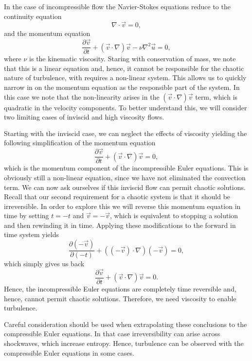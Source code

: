 In the case of incompressible flow the Navier-Stokes equations reduce to the continuity equation
\begin{equation}
	\nabla \cdot \vec{v} = 0,
\end{equation}
and the momentum equation
\begin{equation}
	\frac{\partial \vec{v}}{\partial t} + \left(\vec{v} \cdot \nabla \right)\vec{v} - \nu \nabla^2 \vec{u} = 0,
\end{equation}
where $\nu$ is the kinematic viscosity. Staring with conservation of mass, we note that this is a linear equation and, hence, it cannot be responsible for the chaotic nature of turbulence, with requires a non-linear system. This allows us to quickly narrow in on the momentum equation as the responsible part of the system. In this case we note that the non-linearity arises in the $\left(\vec{v} \cdot \nabla \right)\vec{v}$ term, which is quadratic in the velocity components. To better understand this, we will consider two limiting cases of inviscid and high viscosity flows.

Starting with the inviscid case, we can neglect the effects of viscosity yielding the following simplification of the momentum equation
\begin{equation}
	\frac{\partial \vec{v}}{\partial t} + \left(\vec{v} \cdot \nabla \right)\vec{v} = 0,
\end{equation}
which is the momentum component of the incompressible Euler equations. This is obviously still a non-linear equation, since we have not eliminated the convection term. We can now ask ourselves if this inviscid flow can permit chaotic solutions. Recall that our second requirement for a chaotic system is that it should be irreversible. In order to explore this we will reverse this momentum equation in time by setting $t=-t$ and $\vec{v} = -\vec{v}$, which is equivalent to stopping a solution and then rewinding it in time. Applying these modifications to the forward in time system yields
\begin{equation}
	\frac{\partial (-\vec{v})}{\partial (-t)} + \left((-\vec{v}) \cdot \nabla \right)(-\vec{v}) = 0,
\end{equation}
which simply gives us back
\begin{equation}
	\frac{\partial \vec{v}}{\partial t} + \left(\vec{v} \cdot \nabla \right)\vec{v} = 0.
\end{equation}
Hence, the incompressible Euler equations are completely time reversible and, hence, cannot permit chaotic solutions. Therefore, we need viscosity to enable turbulence.
\begin{remark}
Careful consideration should be used when extrapolating these conclusions to the compressible Euler equations. In that case irreversibility can arise across shockwaves, which increase entropy. Hence, turbulence can be observed with the compressible Euler equations in some cases.
\end{remark}

